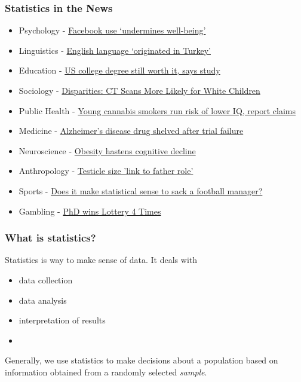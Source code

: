 \begin{frame}
\frametitle{Statistics in the News}
\begin{itemize}
    \item
    Psychology - \href{http://www.bbc.co.uk/news/technology-23709009}{Facebook use `undermines well-being'}
    \item
    Linguistics - \href{http://www.bbc.co.uk/news/science-environment-19368988}{English language `originated in Turkey'}
    \item
    Education - \href{http://www.bbc.co.uk/news/education-20958928}{US college degree still worth it, says study}
    \item
    Sociology - \href{http://well.blogs.nytimes.com/2012/08/13/ct-scans-more-likely-for-white-children/?ref=health}{Disparities: CT Scans More Likely for White Children}
    \item
    Public Health - \href{http://www.bbc.co.uk/news/health-19372456}{Young cannabis smokers run risk of lower IQ, report claims}
    \item
    Medicine - \href{http://www.bbc.co.uk/news/world-us-canada-19159167}{Alzheimer's disease drug shelved after trial failure}
    \item
    Neuroscience - \href{http://www.bbc.co.uk/news/health-19323061}{Obesity hastens cognitive decline}
    \item
    Anthropology - \href{http://www.bbc.co.uk/news/health-24016988}{Testicle size 'link to father role'}
    \item
    Sports - \href{http://www.bbc.co.uk/news/magazine-23724517}{Does it make statistical sense to sack a football manager?}
    \item
    Gambling - \href{http://www.forbes.com/sites/kiriblakeley/2011/07/21/meet-the-luckiest-woman-in-the-world/}{PhD wins Lottery 4 Times}
\end{itemize}
\end{frame}

\begin{frame}
\frametitle{What is statistics?}
  Statistics is way to make sense of data.  It deals with
\begin{itemize}
    \item
    data collection
    \item
    data analysis
    \item
    interpretation of results
    \item[]
\end{itemize}
Generally, we use statistics to make decisions about a population based on information obtained from a randomly selected \emph{sample}.
\end{frame}

